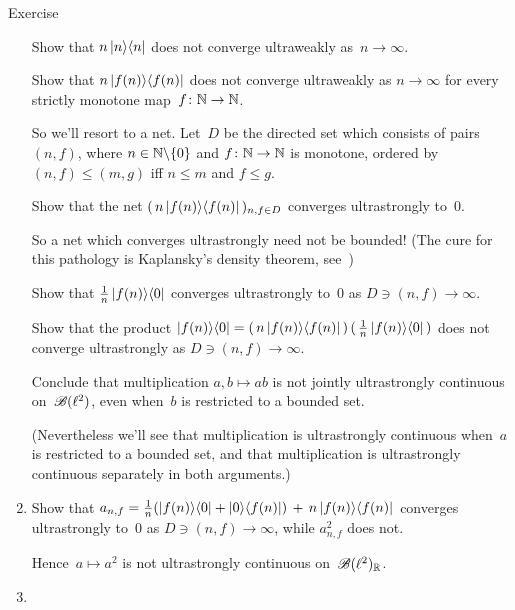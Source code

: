 \documentclass[a]{subfiles}
\begin{document}
\begin{parsec}
\begin{point}{Exercise}
\begin{enumerate}
Show that $n\left|n\right>\!\left<n\right|$ does not converge ultraweakly as~$n\to\infty$.

Show that $n \left|f(n)\right>\!\left<f(n)\right|$ does not converge ultraweakly
as $n\to\infty$
for every strictly monotone map~$f\colon \mathbb{N}\to\mathbb{N}$.

So we'll resort to a net.
Let~$D$ be the directed set which consists of pairs $(n,f)$,
where $n\in \mathbb{N}\backslash\{0\}$ and $f\colon \mathbb{N}\to\mathbb{N}$
is monotone, ordered by $(n,f)\leq (m,g)$ iff $n\leq m$ and $f\leq g$.

Show that the net $(\, n\left|f(n)\right>\!\left<f(n)\right|\,)_{n,f\in D}$
converges ultrastrongly to~$0$.

So a net which converges ultrastrongly need not be bounded!
(The cure for this pathology is Kaplansky's density theorem, 
see~)

Show that $\frac{1}{n} \left|f(n)\right>\!\left<0\right|$
converges ultrastrongly to~$0$ as $D\ni(n,f)\to \infty$.

Show that the product
$\left|f(n)\right>\!\left<0\right| = (\,n\left|f(n)\right>\!\left<f(n)\right|\,)\,(\,\frac{1}{n}
\left|f(n)\right>\!\left<0\right|\,)$
does not converge ultrastrongly 
as $D\ni(n,f)\to\infty$.

Conclude that multiplication $a,b\mapsto ab$
is not jointly ultrastrongly continuous on~$\mathscr{B}(\ell^2)$,
even when~$b$ is restricted to a bounded set.

(Nevertheless we'll see that multiplication is ultrastrongly continuous
when~$a$ is restricted to a bounded set,
and that multiplication is ultrastrongly continuous
separately in both arguments.)

\item
Show that
$a_{n,f} = \frac{1}{n}(\left|f(n)\right>\!\left<0\right|+\left|0\right>\!\left<f(n)\right|)
\,+\, n\left|f(n)\right>\!\left<f(n)\right|$
converges ultrastrongly to~$0$
as $D\ni(n,f)\to\infty$,
while $a_{n,f}^2$ does not.

Hence~$a\mapsto a^2$ is not ultrastrongly continuous on~$\mathscr{B}(\ell^2)_{\mathbb{R}}$.

\item
{}

\end{enumerate}
\end{point}
\end{parsec}
%
%
\end{document}
